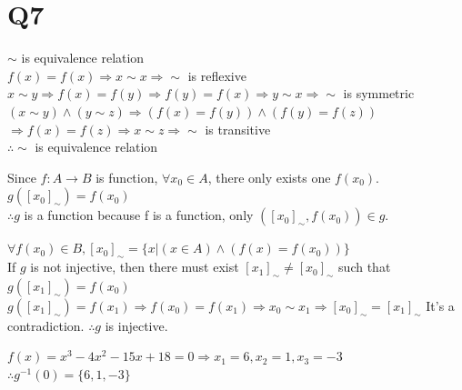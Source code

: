 \documentclass[12pt]{article}
\begin{document}
\section{Q7}
$\sim$ is equivalence relation
\\$f(x)=f(x)\Rightarrow x\sim x\Rightarrow \sim$ is reflexive
\\$x\sim y\Rightarrow f(x)=f(y)\Rightarrow f(y)=f(x)\Rightarrow y\sim x\Rightarrow \sim$ is symmetric
\\$(x\sim y)\wedge(y\sim z)\Rightarrow(f(x)=f(y))\wedge(f(y)=f(z))$
\\$\Rightarrow f(x)=f(z)\Rightarrow x\sim z\Rightarrow\sim$ is transitive
\\$\therefore \sim$ is equivalence relation 
\par Since $f: A\rightarrow B$ is function, $\forall x_0\in A$, there only exists one $f(x_0)$.
\\$g([x_0]_{\sim})=f(x_0)$
\\$\therefore g$ is a function because f is a function, only $([x_0]_{\sim},f(x_0))\in g$. 
\par $\forall f(x_0)\in B,[x_0]_{\sim}=\{x|(x\in A)\wedge(f(x)=f(x_0))\}$  
\\If $g$ is not injective, then there must exist $[x_1]_{\sim}\neq[x_0]_{\sim}$ such that $g([x_1]_\sim)=f(x_0)$
\\$g([x_1]_\sim)=f(x_1)\Rightarrow f(x_0)=f(x_1)\Rightarrow x_0\sim x_1\Rightarrow [x_0]_\sim=[x_1]_\sim$
It's a contradiction. $\therefore g$ is injective.
\par $f(x)=x^3-4x^2-15x+18=0\Rightarrow x_1=6,x_2=1,x_3=-3$
\\$\therefore g^{-1}(0)=\{6,1,-3\}$
\end{document}
